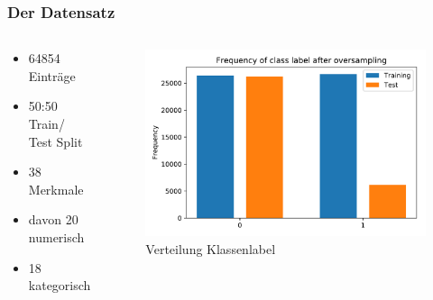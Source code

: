 \documentclass{beamer}
\begin{document}
\begin{frame}
\frametitle{Der Datensatz}
\begin{columns}[c] %

\begin{footnotesize}
\begin{itemize}
\item 64854 Einträge
\item 50:50 Train/ Test Split 
\item 38 Merkmale
\item davon 20 numerisch
\item 18 kategorisch
\end{itemize}
\end{footnotesize}


\begin{figure}
\begin{center}
\includegraphics[width=.8\textwidth]{pdf/oversampled.pdf}
\end{center}
\caption{Verteilung Klassenlabel}
\end{figure}
\end{columns}
\end{frame}

\end{document}

